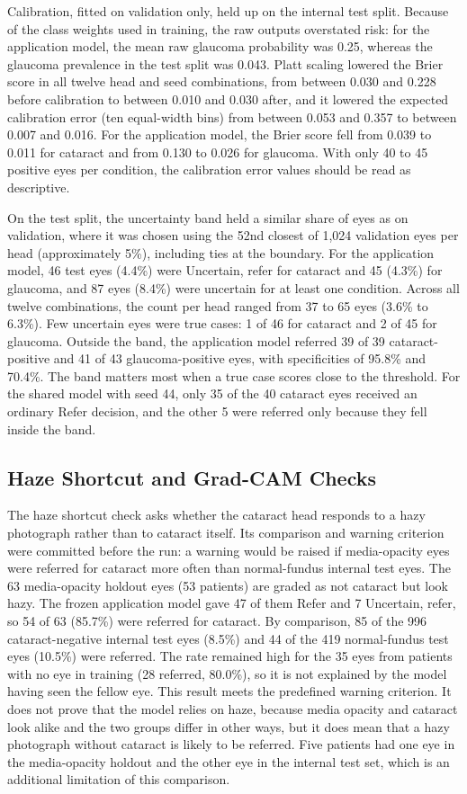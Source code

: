 \documentclass[conference,a4paper]{IEEEtran}
\begin{document}
Calibration, fitted on validation only, held up on the internal test split. Because of the class
weights used in training, the raw outputs overstated risk: for the application model, the mean raw
glaucoma probability was 0.25, whereas the glaucoma prevalence in the test split was 0.043. Platt
scaling lowered the Brier score in all twelve head and seed combinations, from between 0.030 and
0.228 before calibration to between 0.010 and 0.030 after, and it lowered the expected calibration
error (ten equal-width bins) from between 0.053 and 0.357 to between 0.007 and 0.016. For the
application model, the Brier score fell from 0.039 to 0.011 for cataract and from 0.130 to 0.026 for
glaucoma. With only 40 to 45 positive eyes per condition, the calibration error values should be
read as descriptive.

On the test split, the uncertainty band held a similar share of eyes as on validation, where it was
chosen using the 52nd closest of 1,024 validation eyes per head (approximately 5\%), including ties at the boundary. For the application model, 46 test eyes (4.4\%) were
Uncertain, refer for cataract and 45 (4.3\%) for glaucoma, and 87 eyes (8.4\%) were uncertain for at
least one condition. Across all twelve combinations, the count per head ranged from 37 to 65 eyes
(3.6\% to 6.3\%). Few uncertain eyes were true cases: 1 of 46 for cataract and 2 of 45 for glaucoma.
Outside the band, the application model referred 39 of 39 cataract-positive and 41 of 43
glaucoma-positive eyes, with specificities of 95.8\% and 70.4\%. The band matters most when a true
case scores close to the threshold. For the shared model with seed 44, only 35 of the 40 cataract
eyes received an ordinary Refer decision, and the other 5 were referred only because they fell
inside the band.

\subsection{Haze Shortcut and Grad-CAM Checks}

The haze shortcut check asks whether the cataract head responds to a hazy photograph rather than to
cataract itself. Its comparison and warning criterion were committed before the run: a warning would
be raised if media-opacity eyes were referred for cataract more often than normal-fundus internal
test eyes. The 63 media-opacity holdout eyes (53 patients) are graded as not cataract but look hazy.
The frozen application model gave 47 of them Refer and 7 Uncertain, refer, so 54 of 63 (85.7\%) were
referred for cataract. By comparison, 85 of the 996 cataract-negative internal test eyes (8.5\%) and
44 of the 419 normal-fundus test eyes (10.5\%) were referred. The rate remained high for the 35 eyes
from patients with no eye in training (28 referred, 80.0\%), so it is not explained by the model
having seen the fellow eye. This result meets the predefined warning criterion. It does not prove
that the model relies on haze, because media opacity and cataract look alike and the two groups
differ in other ways, but it does mean that a hazy photograph without cataract is likely to be
referred. Five patients had one eye in the media-opacity holdout and the other eye in
the internal test set, which is an additional limitation of this comparison.
\end{document}

